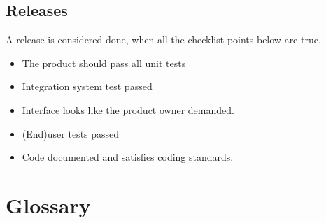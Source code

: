 \documentclass{article}
\begin{document}
\subsection{Releases}
A release is considered done, when all the checklist points below are true.
\begin{itemize}
	\item The product should pass all unit tests
	\item Integration system test passed
	\item Interface looks like the product owner demanded.
	\item (End)user tests passed
	\item Code documented and satisfies coding standards.
\end{itemize}
\section{Glossary}
\end{document}
